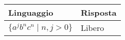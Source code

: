 \documentclass{standalone}
\begin{document}
\begin{tabularx}{\textwidth}{XX}
		Linguaggio & Risposta \\
    \midrule
        $\{ a^j b^n c^n \mid n, j > 0 \}$
        &
				Libero
\end{tabularx}
\end{document}
